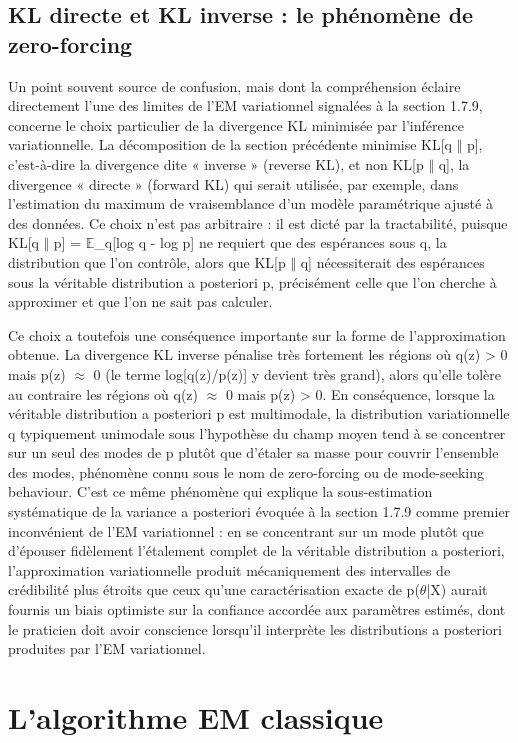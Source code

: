 \subsection{KL directe et KL inverse : le phénomène de zero-forcing}
Un point souvent source de confusion, mais dont la compréhension éclaire directement l'une des limites de l'EM variationnel signalées à la section 1.7.9, concerne le choix particulier de la divergence KL minimisée par l'inférence variationnelle. La décomposition de la section précédente minimise KL[q $\Vert $ p], c'est-à-dire la divergence dite « inverse » (reverse KL), et non KL[p $\Vert $ q], la divergence « directe » (forward KL) qui serait utilisée, par exemple, dans l'estimation du maximum de vraisemblance d'un modèle paramétrique ajusté à des données. Ce choix n'est pas arbitraire : il est dicté par la tractabilité, puisque KL[q $\Vert $ p] = $\mathbb{E}$\_q[log q - log p] ne requiert que des espérances sous q, la distribution que l'on contrôle, alors que KL[p $\Vert $ q] nécessiterait des espérances sous la véritable distribution a posteriori p, précisément celle que l'on cherche à approximer et que l'on ne sait pas calculer.

Ce choix a toutefois une conséquence importante sur la forme de l'approximation obtenue. La divergence KL inverse pénalise très fortement les régions où q(z) > 0 mais p(z) $\approx $ 0 (le terme log[q(z)/p(z)] y devient très grand), alors qu'elle tolère au contraire les régions où q(z) $\approx $ 0 mais p(z) > 0. En conséquence, lorsque la véritable distribution a posteriori p est multimodale, la distribution variationnelle q  typiquement unimodale sous l'hypothèse du champ moyen  tend à se concentrer sur un seul des modes de p plutôt que d'étaler sa masse pour couvrir l'ensemble des modes, phénomène connu sous le nom de zero-forcing ou de mode-seeking behaviour. C'est ce même phénomène qui explique la sous-estimation systématique de la variance a posteriori évoquée à la section 1.7.9 comme premier inconvénient de l'EM variationnel : en se concentrant sur un mode plutôt que d'épouser fidèlement l'étalement complet de la véritable distribution a posteriori, l'approximation variationnelle produit mécaniquement des intervalles de crédibilité plus étroits que ceux qu'une caractérisation exacte de p($\theta $|X) aurait fournis  un biais optimiste sur la confiance accordée aux paramètres estimés, dont le praticien doit avoir conscience lorsqu'il interprète les distributions a posteriori produites par l'EM variationnel.

\section{L'algorithme EM classique}
